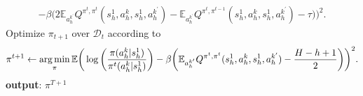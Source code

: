 \begin{algorithm}[t]
\begin{algorithmic}
\begin{align*}
{            -
            \beta \bigg(2\mathbb{E}_{a_h^{k^\prime}}Q^{\pi^t,\pi^t}(s_h^1,a_h^k,s_h^1,a_h^{k^\prime})
            - 
            \mathbb{E}_{a_h^{k^\prime}}Q^{\pi^{t},\pi^{t-1}}(s_h^1,a_h^k,s_h^1,a_h^{k^\prime}
            ) 
            - \tau
            \bigg)
            \bigg)^2.}
        \end{align*}
    \ELSE
        \STATE     Optimize $\pi_{{t+1}}$ over $\mathcal{D}_t$ according to 
        \begin{align*}
        \scalemath{1}{
            \pi^{t+1}
            \leftarrow 
            \argmin_{\pi}
            \mathbb{E}
            \bigg(
            \log \bigg(\frac{\pi(a_h^k|s_h^1)}{\pi^t(a_h^k|s_h^1)}\bigg)
            -
            \beta \bigg(
        \mathbb{E}_{a_h^{k^\prime}}Q^{\pi^t,\pi^t}(s_h^1,a_h^k,s_h^1,a_h^{k^\prime}) 
            -\frac{H-h+1}{2}
            \bigg)
            \bigg)^2.}
        \end{align*}
    \ENDIF
    \ENDFOR
    \STATE \textbf{output}: $\pi^{T+1}$
  \end{algorithmic}
\end{algorithm}

\label{sec:addexp}
